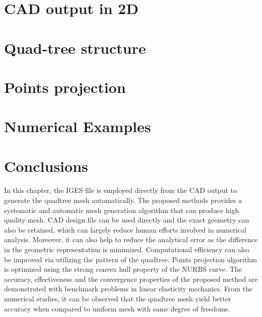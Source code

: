 \section{CAD output in 2D}
\label{qt_sc:iges}


\section{Quad-tree structure}
\label{qt_sc:quadtree}


\section{Points projection}
\label{qt_sc:projection}



\section{Numerical Examples}



% 



\section{Conclusions}
\paragraph{}
In this chapter, the IGES file is employed directly from the CAD output to generate the quadtree mesh automatically.
The proposed methods provides a systematic and automatic mesh generation algorithm that can produce high quality mesh.
CAD design file can be used directly and the exact geometry can also be retained, which can largely reduce human efforts involved in numerical analysis.
Moreover, it can also help to reduce the analytical error as the difference in the geometric representation is minimized.
Computational efficiency can also be improved via utilizing the pattern of the quadtree.
Points projection algorithm is optimized using the strong convex hull property of the NURBS curve.
The accuracy, effectiveness and the convergence properties of the proposed method are demonstrated with benchmark problems in linear elasticity mechanics.
From the numerical studies, it can be observed that the quadtree mesh yield better accuracy when compared to uniform mesh with same degree of freedoms.
